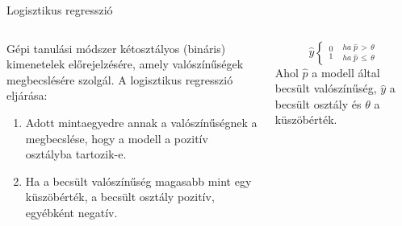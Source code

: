 \documentclass[english, aspectratio=169]{beamer}
\begin{document}
\begin{frame}{Logisztikus regresszió}
\begin{columns}
\begin{column}{.5\textwidth}
Gépi tanulási módszer kétosztályos (bináris) kimenetelek előrejelzésére, amely valószínűségek megbecslésére szolgál. A logisztikus regresszió eljárása:\par\smallskip
\begin{enumerate}
	\item Adott mintaegyedre annak a valószínűségnek a megbecslése, hogy a modell a pozitív osztályba tartozik-e. 
	\item Ha a becsült valószínűség magasabb mint egy küszöbérték, a becsült osztály pozitív, egyébként negatív.
\end{enumerate}
\end{column}
\begin{column}{.5\textwidth}
\begin{block}{}
\[
\hat{y}\begin{cases}
_{1}^{0} & _{ha\;\hat{p}\,\leq\,\theta}^{ha\;\hat{p}\,>\,\theta}\end{cases}
\]
Ahol $\hat{p}$ a modell által becsült valószínűség, $\hat{y}$ a becsült osztály és $\theta$ a küszöbérték.
\end{block}
\end{column}
\end{columns}
\end{frame}
\end{document}
